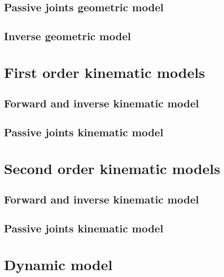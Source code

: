 \documentclass[a4paper]{article}
\begin{document}
\subsection{Passive joints geometric model}
%
\subsection{Inverse geometric model}
\section{First order kinematic models}
%
\subsection{Forward and inverse kinematic model}
%
\subsection{Passive joints kinematic model}
\section{Second order kinematic models}
%
\subsection{Forward and inverse kinematic model}
%
\subsection{Passive joints kinematic model}
\section{Dynamic model}
%
\end{document}
